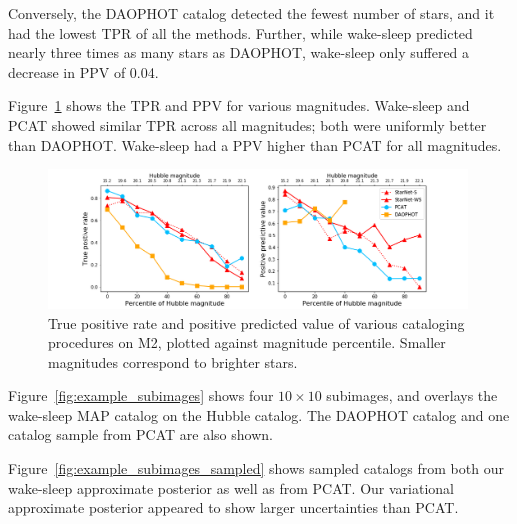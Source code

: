 

Conversely, the DAOPHOT catalog detected the fewest number of stars, and it had the lowest TPR of all the methods.
Further, while wake-sleep predicted nearly three times as many stars as DAOPHOT, wake-sleep only suffered a decrease in PPV of 0.04. 




Figure~\ref{fig:summary_stats} shows the TPR and PPV for various magnitudes.
Wake-sleep and PCAT showed similar TPR across all magnitudes; both were
uniformly better than DAOPHOT. Wake-sleep had a PPV higher than PCAT for all magnitudes. 
\begin{figure}[ht]
    \centering
    \includegraphics[width=0.99\textwidth]{figures/summary_statistics_m2.png}
    \caption{True positive rate and positive predicted value of various cataloging
    procedures on M2, plotted against magnitude percentile.
    Smaller magnitudes correspond to brighter stars. }
    \label{fig:summary_stats}
\end{figure}


Figure~\ref{fig:example_subimages} shows four $10\times10$ subimages, and overlays the wake-sleep MAP catalog on the Hubble catalog. The DAOPHOT catalog and one catalog sample from PCAT are also shown. 

Figure~\ref{fig:example_subimages_sampled} shows sampled catalogs from both our wake-sleep approximate posterior as well as from PCAT.
Our variational approximate posterior appeared to show larger uncertainties
than PCAT. 

